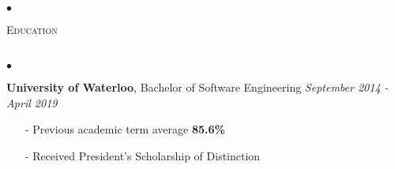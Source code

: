 \documentclass[11pt]{article}
\newcommand{\lineunder}{\vspace*{-8pt} \\ \hspace*{-18pt} \hrulefill \\}
\newcommand{\header}[1]{{\hspace*{-15pt}\vspace*{6pt} \textsc{#1}} \vspace*{-6pt} \lineunder }
\newenvironment{achievements}{\begin{list}{$\bullet$}{\topsep 0pt \itemsep -1.5pt \leftmargin 5pt}}{\vspace*{4pt}\end{list}}
\begin{document}
\begin{achievements}


\end{achievements}

\vspace{9pt}

\header{\fontsize{12.2}{10}\selectfont  Education}
\begin{achievements}
\item \textbf{University of Waterloo}, Bachelor of Software Engineering \hfill \textit {September 2014 - April 2019}
\vspace{2pt}
\begin{itemize}
\item[-] Previous academic term average \textbf{85.6\%} 
\vspace{2pt}
\item[-] Received President's Scholarship of Distinction
\end{itemize}
\end{achievements}
\end{document}
